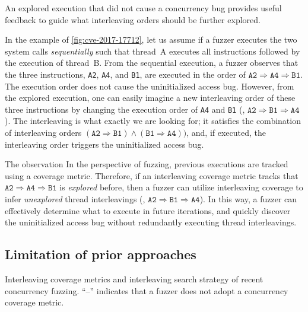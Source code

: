 %
An explored execution that did not cause a concurrency bug provides useful feedback 
to guide what interleaving orders should be further explored.

In the example of \autoref{fig:cve-2017-17712}, let us assume 
if a fuzzer executes the two system calls \textit{sequentially} 
such that thread~A executes all instructions followed by the execution of thread~B.
From the sequential execution, a fuzzer observes that the three instructions,
\texttt{A2}, \texttt{A4}, and \texttt{B1}, are  executed in the order of
$\texttt{A2} \Rightarrow \texttt{A4} \Rightarrow \texttt{B1}$. 
The execution order does not cause the uninitialized access bug.
%
However, from the explored execution, one can easily imagine a new interleaving order of these three
instructions by changing the execution order of \texttt{A4} and
\texttt{B1} (\ie,
$\texttt{A2} \Rightarrow \texttt{B1} \Rightarrow \texttt{A4}$).
%
The  interleaving is what exactly we are looking for; it
satisfies the combination of interleaving orders
$(\texttt{A2} \Rightarrow \texttt{B1}) \wedge (\texttt{B1} \Rightarrow
\texttt{A4}))$, and, if executed, the interleaving order triggers 
the uninitialized access bug.

The observation 
%
In the perspective of fuzzing, previous executions are tracked using a
coverage metric.
%
Therefore, if an interleaving coverage metric tracks that
$\texttt{A2} \Rightarrow \texttt{A4} \Rightarrow \texttt{B1}$ is
\textit{explored} before, then a fuzzer can utilize interleaving
coverage to infer \textit{unexplored} thread interleavings (\eg,
$\texttt{A2} \Rightarrow \texttt{B1} \Rightarrow \texttt{A4}$).
%
In this way, a fuzzer can effectively determine what to execute in
future iterations, and quickly discover the uninitialized access bug
without redundantly executing thread interleavings.



\subsection{Limitation of prior approaches}
\label{ss:existingapproaches}
\begin{table}[t]
  \centering
  
  \caption{Interleaving coverage metrics and interleaving search
    strategy of recent concurrency fuzzing. ``--'' indicates that a
    fuzzer does not adopt a concurrency coverage metric. }
  \label{table:motivation}
\end{table}

